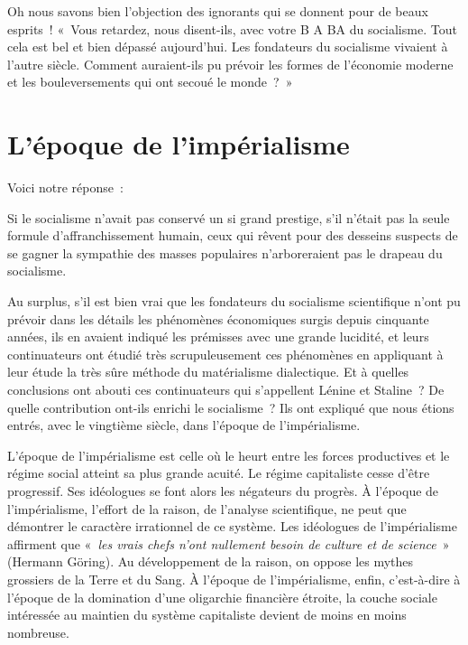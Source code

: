 \documentclass[french,twoside]{book} %
\begin{document}
\noindent Oh nous savons bien l’objection des ignorants qui se donnent pour de beaux esprits ! « Vous retardez, nous disent-ils, avec votre B A BA du socialisme. Tout cela est bel et bien dépassé aujourd’hui. Les fondateurs du socialisme vivaient à l’autre siècle. Comment auraient-ils pu prévoir les formes de l’économie moderne et les bouleversements qui ont secoué le monde ? »
\section[L’époque de l’impérialisme]{L’époque de l’impérialisme}
\noindent Voici notre réponse :\par
Si le socialisme n’avait pas conservé un si grand prestige, s’il n’était pas la seule formule d’affranchissement humain, ceux qui rêvent pour des desseins suspects de se gagner la sympathie des masses populaires n’arboreraient pas le drapeau du socialisme.\par
Au surplus, s’il est bien vrai que les fondateurs du socialisme scientifique n’ont pu prévoir dans les détails les phénomènes économiques surgis depuis cinquante années, ils en avaient indiqué les prémisses avec une grande lucidité, et leurs continuateurs ont étudié très scrupuleusement ces phénomènes en appliquant à leur étude la très sûre méthode du matérialisme dialectique. Et à quelles conclusions ont abouti ces continuateurs qui s’appellent Lénine et Staline ? De quelle contribution ont-ils enrichi le socialisme ? Ils ont expliqué que nous étions entrés, avec le vingtième siècle, dans l’époque de l’impérialisme.\par
L’époque de l’impérialisme est celle où le heurt entre les forces productives et le régime social atteint sa plus grande acuité. Le régime capitaliste cesse d’être progressif. Ses idéologues se font alors les négateurs du progrès. À l’époque de l’impérialisme, l’effort de la raison, de l’analyse scientifique, ne peut que démontrer le caractère irrationnel de ce système. Les idéologues de l’impérialisme affirment que « \emph{les vrais chefs n’ont nullement besoin de culture et de science} » (Hermann Göring). Au développement de la raison, on oppose les mythes grossiers de la Terre et du Sang. À l’époque de l’impérialisme, enfin, c’est-à-dire à l’époque de la domination d’une oligarchie financière étroite, la couche sociale intéressée au maintien du système capitaliste devient de moins en moins nombreuse.
\end{document}
